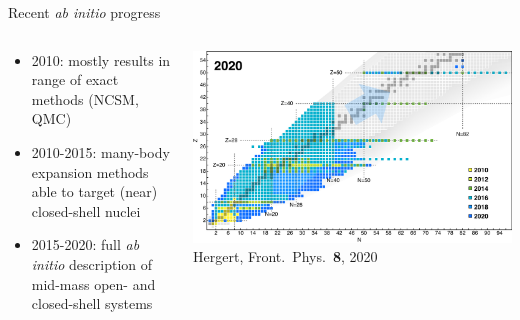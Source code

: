 \documentclass[aspectratio=169]{beamer}
\begin{document}
\begin{frame}{Recent \textit{ab initio} progress}
  \begin{columns}[t]
    \begin{column}{0.4\textwidth}
      \begin{itemize}
        \item 2010: mostly results in range of exact methods (NCSM, QMC)
        \item 2010-2015: many-body expansion methods able to target (near) closed-shell nuclei
        \item 2015-2020: full \textit{ab initio} description of mid-mass open- and closed-shell systems
      \end{itemize}

    \end{column}
    \begin{column}{0.60\textwidth}
      \begin{center}
        \includegraphics[width=\textwidth]{thesis/talk/images/external/ab_initio_progress.pdf} \\
        {\tiny Hergert, Front.~Phys.~\textbf{8}, 2020}
      \end{center}
    \end{column}
  \end{columns}
\end{frame}
\end{document}
